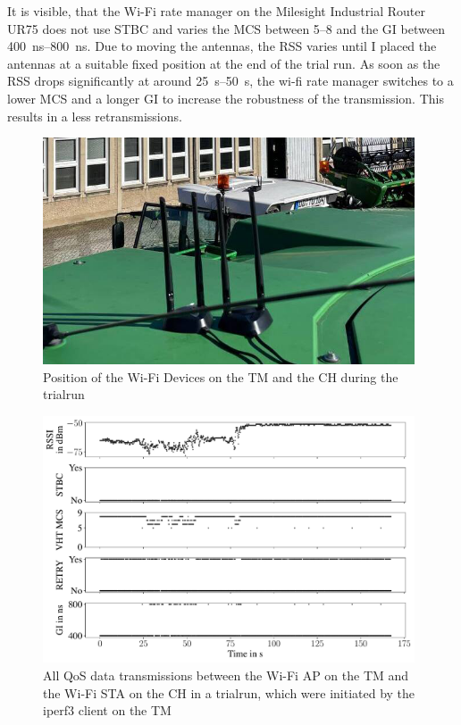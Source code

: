 It is visible, that the Wi-Fi rate manager on the Milesight Industrial Router UR75 does not use \ac{STBC} and varies
the \ac{MCS} between \numrange{5}{8} and the \ac{GI} between \SIrange{400}{800}{\nano\second}.
Due to moving the antennas, the \ac{RSS} varies until I placed the antennas at a suitable fixed position at the end of the trial run.
As soon as the \ac{RSS} drops significantly at around \SIrange{25}{50}{\second}, the wi-fi rate manager switches to a lower \ac{MCS} and a longer
\ac{GI} to increase the robustness of the transmission.
This results in a less retransmissions.




\begin{figure}[H]%
	\centering
	\includegraphics[width=0.98\textwidth]{figures/trainRun}
	\caption{Position of the Wi-Fi Devices on the \ac{TM} and the \ac{CH} during the trialrun}
	\label{fig:trailrunPositions}%
\end{figure}

\begin{figure}[H]%
	\centering
	\includegraphics[width=0.98\textwidth]{figures/wireless5_144}
	\caption{All QoS data transmissions between the Wi-Fi \acf{AP} on the \acf{TM} and the Wi-Fi \ac{STA} on the \acf{CH} in a trialrun,
	which were initiated by the iperf3 client on the \acf{TM}}
	\label{fig:trailrunIperf}%
\end{figure}



